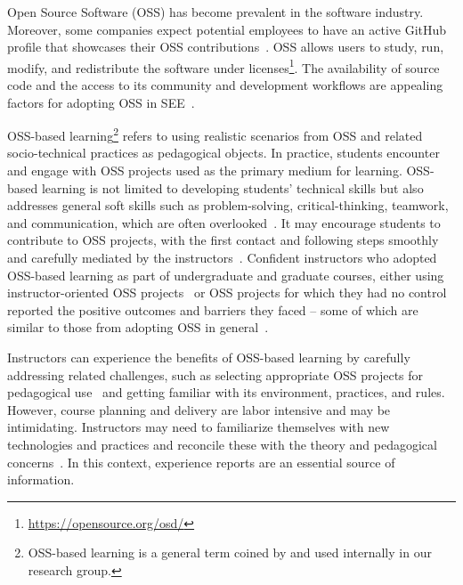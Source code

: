 \documentclass[sigconf]{acmart}
\begin{document}
Open Source Software (OSS) has become prevalent in the software industry. Moreover, some companies expect potential employees to have an active GitHub profile that showcases their OSS contributions~\cite{robles:2019}. 
OSS allows users to study, run, modify, and redistribute the software under licenses\footnote{\url{https://opensource.org/osd/}}.
The availability of source code and the access to its community and development workflows are appealing factors for adopting OSS in SEE~\cite{Bishop:2016, nascimento:fie:2018, DBLP:conf/icse/0001FSSM19}.

OSS-based learning\footnote{OSS-based learning is a general term coined by and used internally in our research group.}
refers to using realistic scenarios from OSS and related socio-technical practices as pedagogical objects.
In practice, students encounter and engage with OSS projects
used as the primary medium for learning.
OSS-based learning is not limited to developing students' technical skills but also addresses general soft skills such as problem-solving, critical-thinking, teamwork, and communication, which are often overlooked~\cite{garousi2019closing}. 
It may encourage students to contribute to OSS projects, with the first contact and following steps smoothly and carefully mediated by the instructors~\cite{spinellis:acm:2021}.
%
Confident instructors who adopted OSS-based learning as part of undergraduate and graduate courses,  either using instructor-oriented OSS projects~\cite{tos:2023, nascimento:fie:2018, DBLP:conf/sbes/SilvaBTC19} or OSS projects for which they had no control~\cite{pinto:cseet:2017, DBLP:conf/sbes/FerreiraS0SM18, DBLP:conf/icse/0001FSSM19} reported the positive outcomes and barriers they faced -- some of which are similar to those from adopting OSS in general~\cite{stein:2014}.

Instructors can experience the benefits of OSS-based learning by carefully addressing related challenges, such as selecting appropriate OSS projects for pedagogical use~\cite{smith:2014} and getting familiar with its environment, practices, and rules.
%
However, course planning and delivery are labor intensive and may be intimidating. Instructors may need to familiarize themselves with new technologies and practices and reconcile these with the theory and pedagogical concerns~\cite{Silva:Santos:Flach:2023}.
%
In this context, experience reports are an essential source of information.


\end{document}
